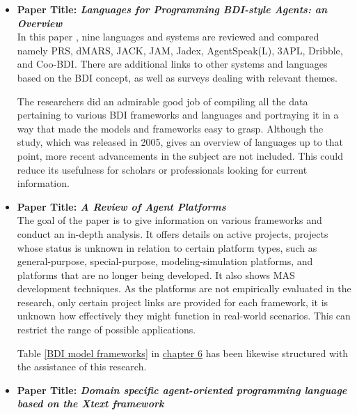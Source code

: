 \begin{itemize}[label={}]

\item \textbf{Paper Title: \textit{Languages for Programming \ac{BDI}-style Agents: an Overview}}\\

In this paper \cite{9lang}, nine languages and systems are reviewed and compared namely PRS, dMARS, JACK, JAM, Jadex, AgentSpeak(L), 3APL, Dribble, and Coo-\ac{BDI}. There are additional links to other systems and languages based on the \ac{BDI} concept, as well as surveys dealing with relevant themes.

\vspace{.5cm}
The researchers did an admirable good job of compiling all the data pertaining to various \ac{BDI} frameworks and languages and portraying it in a way that made the models and frameworks easy to grasp. Although the study, which was released in 2005, gives an overview of languages up to that point, more recent advancements in the subject are not included. This could reduce its usefulness for scholars or professionals looking for current information.
\vspace{.5cm}

\item \textbf{Paper Title: \textit{A Review of Agent Platforms}}\\

The goal of the paper \cite{review} is to give information on various frameworks and conduct an in-depth analysis. It offers details on active projects, projects whose status is unknown in relation to certain platform types, such as general-purpose, special-purpose, modeling-simulation platforms, and platforms that are no longer being developed. It also shows \ac{MAS} development techniques. As the platforms are not empirically evaluated in the research, only certain project links are provided for each framework, it is unknown how effectively they might function in real-world scenarios. This can restrict the range of possible applications.

\vspace{.5cm}

Table \ref{BDI model frameworks} in \hyperref[sec:discussion]{chapter 6} has been likewise structured with the assistance of this research.

\vspace{.5cm}

\item \textbf{Paper Title: \textit{Domain specific agent-oriented programming language based on the Xtext framework}} \\


\end{itemize}
